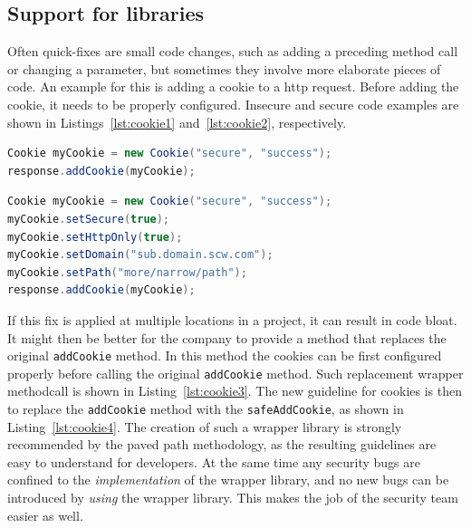 \subsection{Support for libraries}
Often quick-fixes are small code changes, such as adding a preceding method call or changing a parameter, but sometimes they involve more elaborate pieces of code.
An example for this is adding a cookie to a \gls{http} request.
Before adding the cookie, it needs to be properly configured.
Insecure and secure code examples are shown in Listings~\ref{lst:cookie1} and~\ref{lst:cookie2}, respectively.

\begin{lstlisting}[float,language={Java},caption={This cookie is not configured before it is added to the response, as a result this code fragment is insecure.}, float,label={lst:cookie1},abovecaptionskip=-0.0pt]
Cookie myCookie = new Cookie("secure", "success");
response.addCookie(myCookie);
\end{lstlisting}

\begin{lstlisting}[language={Java},caption={Several configuration options are added to narrow the scope that the cookie can be used, and to ensure it is not sent over plaintext.}, float,label={lst:cookie2},abovecaptionskip=-0.0pt]
Cookie myCookie = new Cookie("secure", "success");
myCookie.setSecure(true);
myCookie.setHttpOnly(true);
myCookie.setDomain("sub.domain.scw.com");
myCookie.setPath("more/narrow/path");
response.addCookie(myCookie);
\end{lstlisting}

If this fix is applied at multiple locations in a project, it can result in code bloat.
It might then be better for the company to provide a method that replaces the original \texttt{addCookie} method.
In this method the cookies can be first configured properly before calling the original \texttt{addCookie} method.
Such replacement wrapper methodcall is shown in Listing~\ref{lst:cookie3}.
The new guideline for cookies is then to replace the \texttt{addCookie} method with the \texttt{safeAddCookie}, as shown in Listing~\ref{lst:cookie4}.
The creation of such a wrapper library is strongly recommended by the paved path methodology, as the resulting guidelines are easy to understand for developers.
At the same time any security bugs are confined to the \textit{implementation} of the wrapper library, and no new bugs can be introduced by \textit{using} the wrapper library. This makes the job of the security team easier as well.

